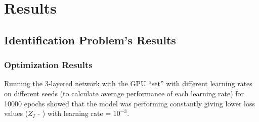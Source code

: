 \chapter{Results} \label{sec:Results}
\section{Identification Problem's Results} \label{sec:Identification Problem's Results}
\subsection{Optimization Results} \label{sec:IdProbRes - Optimization}
Running the 3-layered network with the GPU ``set'' with different learning rates on different seeds (to calculate average performance of each learning rate) for 10000 epochs showed that the model was performing constantly giving lower loss values ($Z_I$ - ) with learning rate = $10^{-3}$. 

